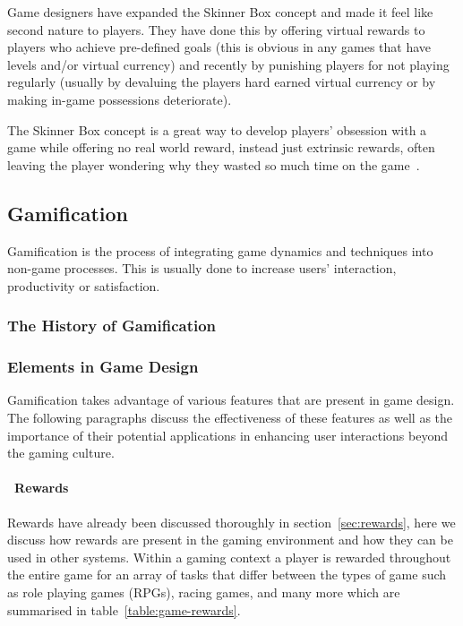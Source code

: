 \documentclass[a4paper,12pt]{article}
\begin{document}
\par
Game designers have expanded the Skinner Box concept and made it feel like second nature to players. They have done this by offering virtual rewards to players who achieve pre-defined goals (this is obvious in any games that have levels and/or virtual currency) and recently by punishing players for not playing regularly (usually by devaluing the players hard earned virtual currency or by making in-game possessions deteriorate).
\par
The Skinner Box concept is a great way to develop players’ obsession with a game while offering no real world reward, instead just extrinsic rewards, often leaving the player wondering why they wasted so much time on the game~\citep{fiveCreepyWays,bread-and-games}. 

\subsection{Gamification}\label{sec:gamification}
Gamification is the process of integrating game dynamics and techniques into non-game processes. This is usually done to increase users' interaction, productivity or satisfaction.

\subsubsection{The History of Gamification}

\subsubsection{Elements in Game Design}
Gamification takes advantage of various features that are present in game design. The following paragraphs discuss the effectiveness of these features as well as the importance of their potential applications in enhancing user interactions beyond the gaming culture. 

\paragraph{\indent~Rewards\\}
Rewards have already been discussed thoroughly in section~\ref{sec:rewards}, here we discuss how rewards are present in the gaming environment and how they can be used in other systems. 
Within a gaming context a player is rewarded throughout the entire game for an array of tasks that differ between the types of game such as role playing games (RPGs), racing games, and many more which are summarised in table~\ref{table:game-rewards}.
\end{document}
